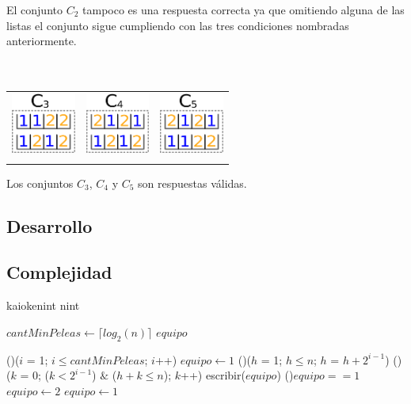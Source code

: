  El conjunto $C_{2}$ tampoco es una respuesta correcta ya que omitiendo alguna de las listas el conjunto sigue cumpliendo con las tres condiciones nombradas anteriormente. \\
 \\
 \\

{\begin{tabular}{ccc}
   \includegraphics[height=2cm]{graficos/c3.png} & \includegraphics[height=2cm]{graficos/c4.png} & \includegraphics[height=2cm]{graficos/c5.png} \\
   \\

\end{tabular}}

  Los conjuntos $C_{3}$, $C_{4}$ y $C_{5}$ son respuestas válidas. 




    \subsection{Desarrollo}


    \subsection{Complejidad}

    \begin{algoritmo}{kaioken}{int n}{int}

   $cantMinPeleas \gets \lceil log_{2}(n) \rceil$ 
   $equipo$ 

  \For(){($i$ = 1; $i \leq cantMinPeleas$; $i$++)}{
    $equipo \gets 1$ 
    \For(){($h$ = 1; $h \leq n$; $h$ = $h + 2^{i-1}$)}{
      \For(){($k$ = 0; ($k < 2^{i-1}$) $\&$ ($h+k \leq n$); $k$++)}{
        escribir($equipo$) 
      }
        \eIf(){$equipo == 1$}{
          $equipo \gets 2$ \;
        }{
          $equipo \gets 1$ \;
        }
    }
  }


\end{algoritmo}

